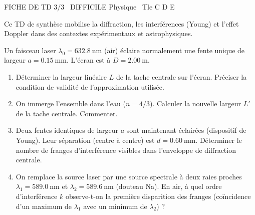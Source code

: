 \documentclass[11pt]{article}
\begin{document}
\begin{tcolorbox}[enhanced,colback=popink,colframe=popink,arc=10pt,boxrule=0pt,left=12pt,right=12pt,top=9pt,bottom=9pt]
{\color{white}\popxbold\small FICHE DE TD 3/3 \textbullet\ DIFFICILE \hfill Physique \textbullet\ Tle C D E\par}
\end{tcolorbox}
\vspace{4pt}
Ce TD de synthèse mobilise la diffraction, les interférences (Young) et l'effet Doppler dans des contextes expérimentaux et astrophysiques.

\begin{exercice}
Un faisceau laser $\lambda_0 = \SI{632,8}{\nano\meter}$ (air) éclaire normalement une fente unique de largeur $a = \SI{0,15}{\milli\meter}$. L'écran est à $D = \SI{2,00}{\meter}$.
\begin{enumerate}
    \item Déterminer la largeur linéaire $L$ de la tache centrale sur l'écran. Préciser la condition de validité de l'approximation utilisée.
    \item On immerge l'ensemble dans l'eau ($n = 4/3$). Calculer la nouvelle largeur $L'$ de la tache centrale. Commenter.
    \item Deux fentes identiques de largeur $a$ sont maintenant éclairées (dispositif de Young). Leur séparation (centre à centre) est $d = \SI{0,60}{\milli\meter}$. Déterminer le nombre de franges d'interférence visibles dans l'enveloppe de diffraction centrale.
    \item On remplace la source laser par une source spectrale à deux raies proches $\lambda_1 = \SI{589,0}{\nano\meter}$ et $\lambda_2 = \SI{589,6}{\nano\meter}$ (douteau Na). En air, à quel ordre d'interférence $k$ observe-t-on la première disparition des franges (coïncidence d'un maximum de $\lambda_1$ avec un minimum de $\lambda_2$) ?
\end{enumerate}
\end{exercice}
\end{document}

